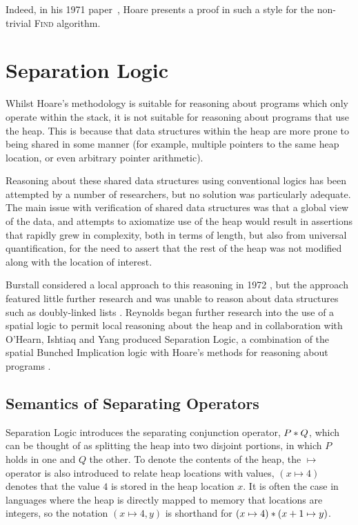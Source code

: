 \documentclass[a4paper,notitlepage]{report}
\begin{document}
  Indeed, in his 1971 paper~\cite{Hoare1971proof}, Hoare presents a proof in
  such a style for the non-trivial \textsc{Find} algorithm.


\section{Separation Logic}

  Whilst Hoare's methodology is suitable for reasoning about programs which only
  operate within the stack, it is not suitable for reasoning about programs that
  use the heap. This is because that data structures within the heap are more
  prone to being shared in some manner (for example, multiple pointers to the
  same heap location, or even arbitrary pointer arithmetic).

  Reasoning about these shared data structures using conventional logics has been attempted by a number of
  researchers, but no solution was particularly adequate. The main issue with
  verification of shared data structures was that a global view of the data, and
  attempts to axiomatize use of the heap would result in assertions
  that rapidly grew in complexity, both in terms of length, but also from
  universal quantification, for the need to assert that the rest of the heap was
  not modified along with the location of interest.

  Burstall considered a local approach to this reasoning in 1972
  \cite{burstall1972some}, but the approach featured little further research and
  was unable to reason about data structures such as doubly-linked lists
  \cite{reynolds2000intuitionistic}. Reynolds began further research into the
  use of a spatial logic to permit local reasoning about the heap and in
  collaboration with O'Hearn, Ishtiaq and Yang produced Separation Logic, a
  combination of the spatial Bunched Implication logic with Hoare's methods for
  reasoning about programs
  \cite{Ishtiaq2001BI,OHearn2001Local,Reynolds2002Separation}.

  \subsection{Semantics of Separating Operators}

  Separation Logic introduces the separating conjunction operator, $P \mathbin{*} Q$,
  which can be thought of as splitting the heap into two disjoint portions, in
  which $P$ holds in one and $Q$ the other. To denote the contents of the
  heap, the $\mapsto$ operator is also introduced to relate heap locations with
  values, $(x \mapsto 4)$ denotes that the value $4$ is stored in the heap
  location $x$. It is often the case in languages where the heap is directly
  mapped to memory that locations are integers, so the notation $(x \mapsto 4,
  y)$ is shorthand for $(x \mapsto 4) \mathbin{*} (x+1 \mapsto y)$.
\end{document}
